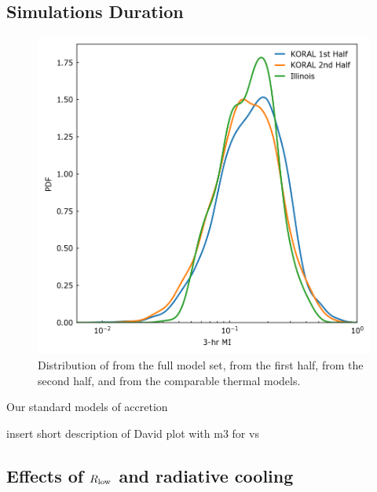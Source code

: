 


\subsection{Simulations Duration}\label{app:narayan}

\begin{figure}
  \centering
  \includegraphics[width=\columnwidth]{./figures/Koral_vs_IL_MI.png}
  \caption{Distribution of  from the full \koral model set, from the first half, from the second half, and from the comparable \kharma thermal models.}
  \label{fig:koral_MI}
\end{figure}  

Our standard models of accretion 

insert short description of David plot with m3 for \koral vs \kharma

\subsection{Effects of $R_\mathrm{low}$ and radiative cooling}

